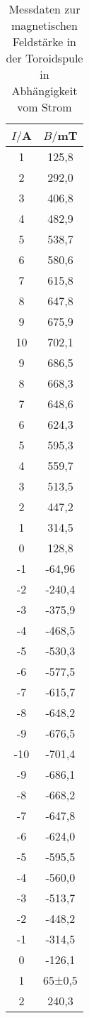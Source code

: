 \begin{table}
  \centering
  \caption{Messdaten zur magnetischen Feldstärke in der Toroidspule in Abhängigkeit
  vom Strom}
  \label{tab:hysterese}
  \begin{tabular}{c c}
    \toprule
    $I/$A & $B/$mT\\
    \midrule
    1	  &  125,8\\
    2	  &  292,0\\
    3	  &  406,8\\
    4	  &  482,9\\
    5	  &  538,7\\
    6	  &  580,6\\
    7	  &  615,8\\
    8	  &  647,8\\
    9	  &  675,9\\
    10	&  702,1\\
    9	  &  686,5\\
    8	  &  668,3\\
    7	  &  648,6\\
    6	  &  624,3\\
    5	  &  595,3\\
    4	  &  559,7\\
    3	  &  513,5\\
    2	  &  447,2\\
    1	  &  314,5\\
    0	  &  128,8\\
    -1	&  -64,96\\
    -2	&  -240,4\\
    -3	&  -375,9\\
    -4	&  -468,5\\
    -5	&  -530,3\\
    -6	&  -577,5\\
    -7	&  -615,7\\
    -8	&  -648,2\\
    -9	&  -676,5\\
    -10	&  -701,4\\
    -9	&  -686,1\\
    -8	&  -668,2\\
    -7	&  -647,8\\
    -6	&  -624,0\\
    -5	&  -595,5\\
    -4	&  -560,0\\
    -3	&  -513,7\\
    -2	&  -448,2\\
    -1	&  -314,5\\
    0	  &  -126,1\\
    1	  &  65±0,5\\
    2	  &  240,3\\
    \bottomrule
  \end{tabular}
\end{table}

